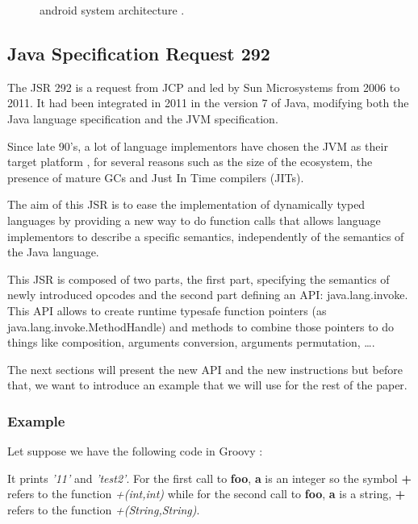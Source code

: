 \documentclass{sig-alternate}
\def \JCP{JCP\xspace}
\def \SUN{Sun Microsystems\xspace}
\def \Jsr{JSR\xspace}
\def \JSR{\Jsr 292\xspace}
\def \JVM{JVM\xspace}
\begin{document}
    \begin{figure}[!h]
      \centering \resizebox{\linewidth}{!}{}
      \caption{android system architecture \cite{wiki-android}.}
      \label{ASA}
    \end{figure}

  \subsection{Java Specification Request 292}

    The \JSR is a request from \JCP and led by \SUN from 2006 to 2011.
    It had been integrated in 2011 in the version 7 of Java,
    modifying both the Java language specification and the \JVM specification.

    Since late 90's, a lot of language
    implementors have chosen the JVM as their target platform \cite{wiki-jvm-lang},
    for several reasons such as the size of the ecosystem,
    the presence of mature GCs and Just In Time compilers (JITs).

    The aim of this \Jsr is to ease the implementation of dynamically typed languages
    by providing a new way to do function calls that allows language implementors
    to describe a specific semantics, independently of the semantics of the Java language.

    This \Jsr is composed of two parts, the first part, specifying the semantics of
    newly introduced opcodes and the second part defining an API: java.lang.invoke.
    This API allows to create runtime typesafe function pointers (as java.lang.invoke.MethodHandle)
    and methods to combine those pointers to do things like composition, arguments conversion,
    arguments permutation, \dots.

    The next sections will present the new API and the new instructions but before that,
    we want to introduce an example that we will use for the rest of the paper.

    \subsubsection{Example}
      Let suppose we have the following code in Groovy \cite{lang-groovy}:

      

      It prints {\it '11'} and {\it 'test2'}.
      For the first call to {\bf foo}, {\bf a} is an integer so the symbol {\bf +} refers
      to the function {\it +(int,int)} while for the second call to {\bf foo}, {\bf a} is a string, {\bf +} refers to the function {\it +(String,String)}.
\end{document}
